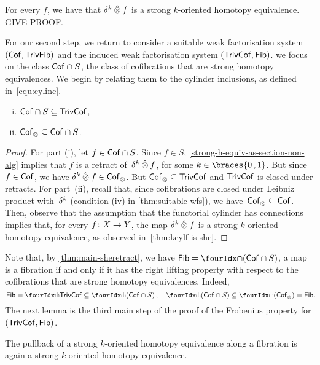 \documentclass[reqno,10pt,a4paper,oneside,draft]{amsart}
\begin{document}
{{\begin{remark} \label{thm:kcylf-is-she}
For every $f$, we have that $\delta^k \mathbin{\hat{\otimes}} f$ is a strong $k$-oriented homotopy equivalence. GIVE PROOF.
\end{remark} 

For our second step, we return to consider a suitable weak factorisation system $(\mathsf{Cof}, \mathsf{TrivFib})$ and the induced weak factorisation system
$(\mathsf{TrivCof}, \mathsf{Fib})$. we focus on the class $\mathsf{Cof} \cap S$, \ie the class of cofibrations that are strong homotopy equivalences. We begin by relating them to the cylinder inclusions, as defined in~\eqref{equ:cylinc}.

\begin{lemma}  \label{thm:main-sheretract} \hfill 
\begin{enumerate}[(i)] 
\item $\mathsf{Cof} \cap S \subseteq \mathsf{TrivCof}$,
\item $\mathsf{Cof}_\otimes \subseteq \mathsf{Cof} \cap S$. 
\end{enumerate}
\end{lemma}

\begin{proof} For part (i), let $f \in  \mathsf{Cof} \cap S$. Since $f \in S$, \cref{strong-h-equiv-as-section-non-alg} implies that $f$ is a retract of~$\delta^k \mathbin{\hat{\otimes}} f$, for some $k \in \braces{0 \, , 1 }$. But since $f \in \mathsf{Cof}$, we have $\delta^k \mathbin{\hat{\otimes}} f \in \mathsf{Cof}_\otimes$. But $\mathsf{Cof}_\otimes \subseteq \mathsf{TrivCof}$ and $\mathsf{TrivCof}$ is closed under retracts. For part~(ii), recall 
that, since cofibrations are closed under Leibniz product with~$\delta^k$ (condition (iv) in \cref{thm:suitable-wfs}), we have~$\mathsf{Cof}_\otimes  \subseteq \mathsf{Cof}$.
Then, observe that the assumption that the functorial cylinder has connections implies that, 
for every $f \colon X \to Y$, the map $\delta^k \mathbin{\hat{\otimes}} f$ is a strong $k$-oriented homotopy equivalence, as observed 
in~\cref{thm:kcylf-is-she}.
\end{proof}


Note that, by \cref{thm:main-sheretract}, we have $\Fib = \liftr{(\Cof \cap S)}$, \ie a map is a fibration if and only if it has the right lifting property with respect to the cofibrations that are strong homotopy equivalences. Indeed, 
\[
  \Fib =  \liftr{\TrivCof}  \subseteq \liftr{(\Cof \cap S)} \, , \quad
  \liftr{(\Cof \cap S)}  \subseteq \liftr{(\Cof_\otimes)} = \Fib \rlap{.} 
\]
The next lemma is the third main step of the proof of the Frobenius property for $(\mathsf{TrivCof}, \mathsf{Fib})$. 

\begin{lemma} 
\label{thm:non-alg-frobenius-she}
The pullback of a strong $k$-oriented homotopy equivalence along a fibration is again a strong $k$-oriented 
homotopy equivalence.
\end{lemma} 

}}
\end{document}
